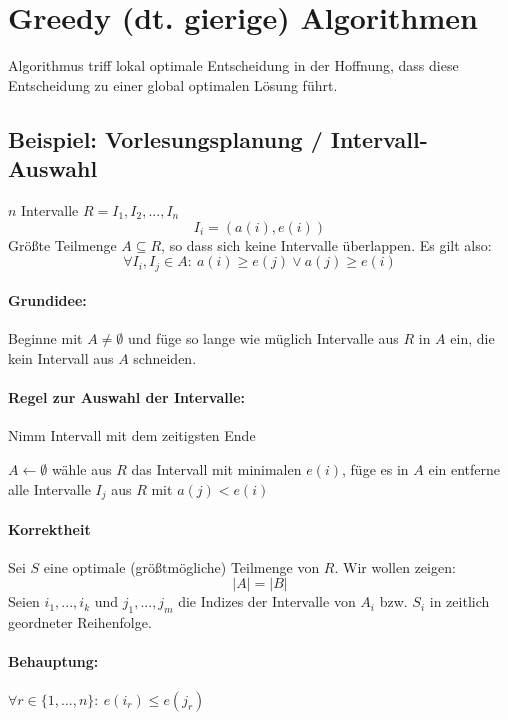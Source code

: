 \section[Greedy Algorithmen]{Greedy (dt. gierige) Algorithmen}
Algorithmus triff lokal optimale Entscheidung in der Hoffnung, dass diese Entscheidung zu einer global optimalen Lösung führt.

\subsection{Beispiel: Vorlesungsplanung / Intervall-Auswahl}
\Geg     $n$ Intervalle $R = {I_1, I_2, ..., I_n}$
         \[I_i = (a(i), e(i))\]
\Ges     Größte Teilmenge $A \subseteq R$, so dass sich keine Intervalle überlappen.
         Es gilt also:
         \[ \forall I_i, I_j \in A{:}\ a(i) \geq e(j) \lor a(j) \geq e(i) \]
\paragraph*{Grundidee:} Beginne mit $A \neq \emptyset$ und füge so lange wie müglich Intervalle aus $R$ in $A$ ein, die kein Intervall aus $A$ schneiden.

\paragraph*{Regel zur Auswahl der Intervalle:} Nimm Intervall mit dem zeitigsten Ende
\begin{algorithmic}
 \STATE $A \gets \emptyset$
 \STATE wähle aus $R$ das Intervall mit minimalen $e(i)$, füge es in $A$ ein
 \STATE entferne alle Intervalle $I_j$ aus $R$ mit $a(j) < e(i)$
 \ENDWHILE
\end{algorithmic}

\paragraph*{Korrektheit} Sei $S$ eine optimale (größtmögliche) Teilmenge von $R$. Wir wollen zeigen: 
\[|A| = |B|\]
Seien $i_1,...,i_k$ und $j_1,...,j_m$ die Indizes der Intervalle von $A_i$ bzw. $S_i$ in zeitlich geordneter Reihenfolge.

\paragraph*{Behauptung:} $\forall r \in \{1,...,n\}{:}\ e(i_r) \leq e(j_r)$

